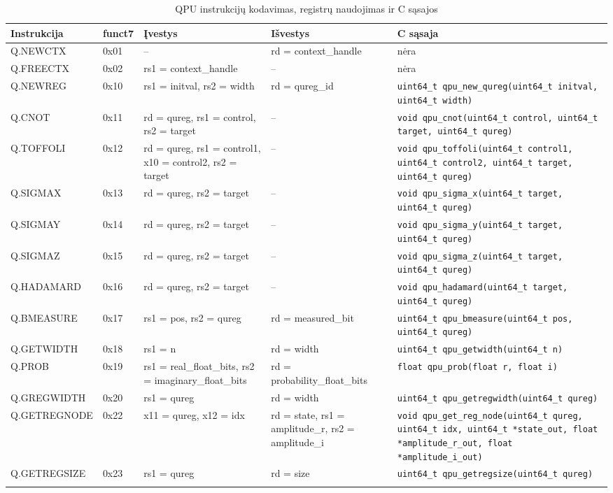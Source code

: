 {\begin{xltabular}{\textwidth}{|l|l|
  >{\hsize}X|
  >{\hsize}X|
  >{\hsize}X|}
\hline
\textbf{Instrukcija} & \textbf{funct7} & \textbf{Įvestys} & \textbf{Išvestys} & \textbf{C sąsaja} \\
\hline
Q.NEWCTX & 0x01 & -- & rd = context\_handle & nėra \\
\hline
Q.FREECTX & 0x02 & rs1 = context\_handle & -- & nėra \\
\hline
Q.NEWREG & 0x10 & rs1 = initval, rs2 = width & rd = qureg\_id &
\texttt{uint64\_t qpu\_new\_qureg(uint64\_t initval, uint64\_t width)} \\
\hline
Q.CNOT & 0x11 & rd = qureg, rs1 = control, rs2 = target & -- &
\texttt{void qpu\_cnot(uint64\_t control, uint64\_t target, uint64\_t qureg)} \\
\hline
Q.TOFFOLI & 0x12 & rd = qureg, rs1 = control1, x10 = control2, rs2 = target & -- &
\texttt{void qpu\_toffoli(uint64\_t control1, uint64\_t control2, uint64\_t target, uint64\_t qureg)} \\
\hline
Q.SIGMAX & 0x13 & rd = qureg, rs2 = target & -- &
\texttt{void qpu\_sigma\_x(uint64\_t target, uint64\_t qureg)} \\
\hline
Q.SIGMAY & 0x14 & rd = qureg, rs2 = target & -- &
\texttt{void qpu\_sigma\_y(uint64\_t target, uint64\_t qureg)} \\
\hline
Q.SIGMAZ & 0x15 & rd = qureg, rs2 = target & -- &
\texttt{void qpu\_sigma\_z(uint64\_t target, uint64\_t qureg)} \\
\hline
Q.HADAMARD & 0x16 & rd = qureg, rs2 = target & -- &
\texttt{void qpu\_hadamard(uint64\_t target, uint64\_t qureg)} \\
\hline
Q.BMEASURE & 0x17 & rs1 = pos, rs2 = qureg & rd = measured\_bit &
\texttt{uint64\_t qpu\_bmeasure(uint64\_t pos, uint64\_t qureg)} \\
\hline
Q.GETWIDTH & 0x18 & rs1 = n & rd = width &
\texttt{uint64\_t qpu\_getwidth(uint64\_t n)} \\
\hline
Q.PROB & 0x19 & rs1 = real\_float\_bits, rs2 = imaginary\_float\_bits & rd = probability\_float\_bits &
\texttt{float qpu\_prob(float r, float i)} \\
\hline
Q.GREGWIDTH & 0x20 & rs1 = qureg & rd = width &
\texttt{uint64\_t qpu\_getregwidth(uint64\_t qureg)} \\
\hline
Q.GETREGNODE & 0x22 & x11 = qureg, x12 = idx & rd = state, rs1 = amplitude\_r, rs2 = amplitude\_i &
\texttt{void qpu\_get\_reg\_node(uint64\_t qureg, uint64\_t idx, uint64\_t *state\_out, float *amplitude\_r\_out, float *amplitude\_i\_out)} \\
\hline
Q.GETREGSIZE & 0x23 & rs1 = qureg & rd = size &
\texttt{uint64\_t qpu\_getregsize(uint64\_t qureg)} \\
\hline

\caption{QPU instrukcijų kodavimas, registrų naudojimas ir C sąsajos}
\label{table:qpu_instructions}
\end{xltabular}}

